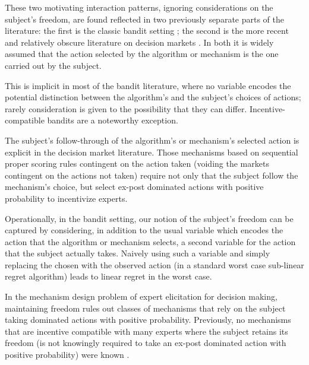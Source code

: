 These two motivating interaction patterns, ignoring considerations on the subject's freedom, are found reflected in two previously separate parts of the literature: the first is the classic bandit setting \citep{thompson:33}; the second is the more recent and relatively obscure literature on decision markets \citep{berg2003prediction,hanson2002decision,othman2010decision,boutilier2012eliciting,chen2014eliciting}. In both it is widely assumed that the action selected by the algorithm or mechanism is the one carried out by the subject.

This is implicit in most of the bandit literature, where no variable encodes the potential distinction between the algorithm's and the subject's choices of actions; rarely consideration is given to the possibility that they can differ. Incentive-compatible bandits \citep{kremer2014implementing,mansour2015bayesian,mansour2016bayesian} are a noteworthy exception.

The subject's follow-through of the algorithm's or mechanism's selected action is explicit in the decision market literature. Those mechanisms based on sequential proper scoring rules contingent on the action taken (voiding the markets contingent on the actions not taken) require not only that the subject follow the mechanism's choice, but select ex-post dominated actions with positive probability to incentivize experts.

Operationally, in the bandit setting, our notion of the subject's freedom can be captured by considering, in addition to the usual variable which encodes the action that the algorithm or mechanism selects, a second variable for the action that the subject actually takes. Naively using such a variable and simply replacing the chosen with the observed action (in a standard worst case sub-linear regret algorithm) leads to linear regret in the worst case.

In the mechanism design problem of expert elicitation for decision making, maintaining freedom rules out classes of mechanisms that rely on the subject taking dominated actions with positive probability. Previously, no mechanisms that are incentive compatible with many experts where the subject retains its freedom (is not knowingly required to take an ex-post dominated action with positive probability) were known \citep{othman2010decision,chen2014eliciting}.



